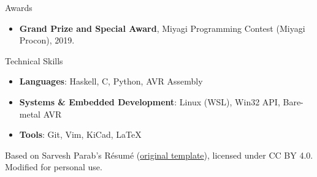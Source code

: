 \documentclass{resume} %
\begin{document}
\begin{rSection}{Awards}
\begin{itemize}
    \item \textbf{Grand Prize and Special Award}, Miyagi Programming Contest (Miyagi Procon), 2019.
\end{itemize}
\end{rSection}

\begin{rSection}{Technical Skills}
\begin{itemize}
    \item \textbf{Languages}: Haskell, C, Python, AVR Assembly
    \item \textbf{Systems \& Embedded Development}: Linux (WSL), Win32 API, Bare-metal AVR
    \item \textbf{Tools}: Git, Vim, KiCad, LaTeX
\end{itemize}
\end{rSection}

\vfill
\begin{center}
    \tiny
    Based on Sarvesh Parab's Résumé
    (\href{https://www.overleaf.com/articles/sarvesh-parabs-resume/ykttqtjgwssv}{original template}),
    licensed under CC BY 4.0.
    Modified for personal use.
\end{center}
\end{document}
